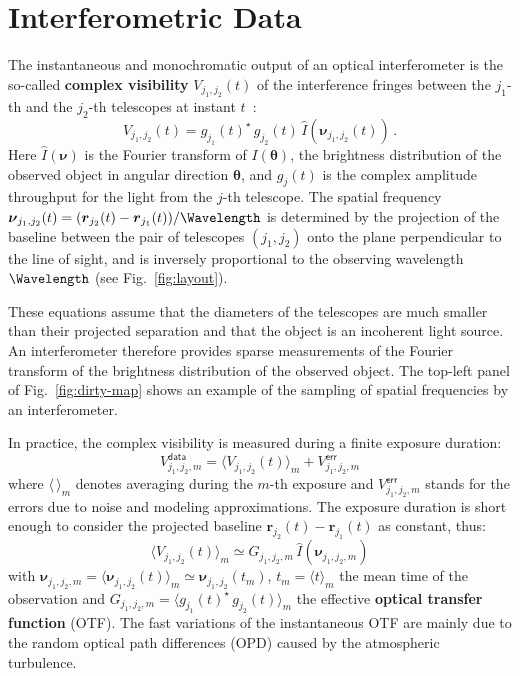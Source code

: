 \documentclass{article}
\newcommand{\vocab}[1]{\textbf{#1}}
\newcommand{\Tag}[1]{\mathsf{#1}}        %
\newcommand{\V}[1]{\boldsymbol{#1}}      %
\newcommand{\FT}[1]{\hat{#1}}            %
\newcommand{\Paren}[1]{\left(#1\right)}
\newcommand{\avg}[1]{\langle #1\rangle}
\newcommand{\Fig}[1]{Fig.~\ref{#1}}
\newcommand{\ComplexVis}{V}
\newcommand{\Freq}{\nu}               %
\newcommand{\VFreq}{\V{\Freq}}
\newcommand{\Dirn}{\theta}            %
\newcommand{\VDirn}{\V{\Dirn}}
\newcommand{\Posn}{r}                 %
\newcommand{\VPosn}{\V{\Posn}}
\newcommand{\Image}{I}
\newcommand{\Gain}{g}
\newcommand{\OTF}{G} %
\newcommand{\DataTag}{\Tag{data}}
\newcommand{\ErrorTag}{\Tag{err}}
\begin{document}
\section{Interferometric Data}
\label{sec:interferometric-data}

The instantaneous and monochromatic output of an optical interferometer is the
so-called \vocab{complex visibility} $\ComplexVis_{j_1,j_2}(t)$ of the
interference fringes between the $j_1$-th and the $j_2$-th telescopes at
instant $t$~\citep{Monnier-2003-interferometry}:
\begin{equation}
  \label{eq:instantaneous-complex-visibility}
  \ComplexVis_{j_1,j_2}(t) = \Gain_{j_1}(t)^{\star} \, \Gain_{j_2}(t) \,
  \FT{\Image}\Paren{\VFreq_{j_1,j_2}(t)} \, .
\end{equation}
Here $\FT{\Image}(\VFreq)$ is the Fourier transform of $\Image(\VDirn)$, the
brightness distribution of the observed object in angular direction $\VDirn$,
and $\Gain_{j}(t)$ is the complex amplitude throughput for the light from the
$j$-th telescope. The spatial frequency $\VFreq_{j_1,j_2}(t) =
(\VPosn_{j_2}(t) - \VPosn_{j_1}(t))/\Wavelength$ is determined by the
projection of the baseline between the pair of telescopes $(j_1,j_2)$ onto the
plane perpendicular to the line of sight, and is inversely proportional to the
observing wavelength $\Wavelength$ (see Fig.~\ref{fig:layout}).

These equations assume that the diameters of the telescopes are much smaller
than their projected separation and that the object is an incoherent light
source.  An interferometer therefore provides sparse measurements of the
Fourier transform of the brightness distribution of the observed object.  The
top-left panel of \Fig{fig:dirty-map} shows an example of the sampling of
spatial frequencies by an interferometer.

In practice, the complex visibility is measured during a finite exposure
duration:
\begin{equation}
  \label{eq:measured-complex-visibility}
  \ComplexVis_{j_1,j_2,m}^\DataTag = \avg{\ComplexVis_{j_1,j_2}(t)}_{m}
  + \ComplexVis_{j_1,j_2,m}^\ErrorTag
\end{equation}
where $\avg{\,}_{m}$ denotes averaging during the $m$-th exposure and
$\ComplexVis_{j_1,j_2,m}^\ErrorTag$ stands for the errors due to noise and
modeling approximations.  The exposure duration is short enough to consider
the projected baseline $\VPosn_{j_2}(t) - \VPosn_{j_1}(t)$ as constant, thus:
\begin{equation}
  \label{eq:averaged-complex-visibility}
  \avg{\ComplexVis_{j_1,j_2}(t)}_{m} \simeq
  \OTF_{j_1,j_2,m}\,
  \FT{\Image}\Paren{\VFreq_{j_1,j_2,m}}
\end{equation}
with $\VFreq_{j_1,j_2,m} = \avg{\VFreq_{j_1,j_2}(t)}_{m} \simeq
\VFreq_{j_1,j_2}(t_m)$, $t_m=\avg{t}_{m}$ the mean time of the observation and
$\OTF_{j_1,j_2,m} = \avg{\Gain_{j_1}(t)^{\star} \, \Gain_{j_2}(t)}_{m}$ the
effective \vocab{optical transfer function} (OTF). The fast variations of the
instantaneous OTF are mainly due to the random optical path differences (OPD)
caused by the atmospheric turbulence.
\end{document}
